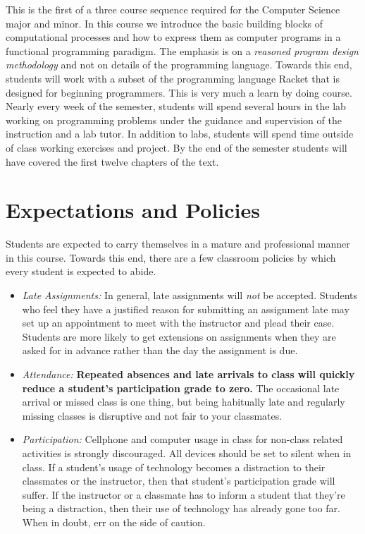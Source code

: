 \documentclass[10pt]{article}
\begin{document}
This is the first of a three course sequence required for the Computer Science major and minor. In this course we introduce the basic building blocks of computational processes and how to express them as computer programs in a functional programming paradigm. The emphasis is on a \textit{reasoned program design methodology} and not on details of the programming language. Towards this end, students will work with a subset of the programming language Racket that is designed for beginning programmers. This is very much a learn by doing course. Nearly every week of the semester, students will spend several hours in the lab working on programming problems under the guidance and supervision of the instruction and a lab tutor. In addition to labs, students will spend time outside of class working exercises and project. By the end of the semester students will have covered the first twelve chapters of the text.

\section{Expectations and Policies}

Students are expected to carry themselves in a mature and professional manner in this course. Towards this end, there are a few classroom policies by which every student is expected to abide.
\begin{itemize}

\item \textit{Late Assignments: } In general, late assignments will \textit{not} be accepted.  Students who feel they have a justified reason for submitting an assignment late may set up an appointment to meet with the instructor and plead their case.  Students are more likely to get extensions on assignments when they are asked for in advance rather than the day the assignment is due.

\item \textit{Attendance: } \textbf{Repeated absences and late arrivals to class will quickly reduce a student's participation grade to zero.}  The occasional late arrival or missed class is one thing, but being habitually late and regularly missing classes is disruptive and not fair to your classmates.

\item \textit{Participation: }  Cellphone and computer usage in class for non-class related activities is strongly discouraged.  All devices should be set to silent when in class.  If a student's usage of technology becomes a distraction to their classmates or the instructor, then that student's participation grade will suffer.  If the instructor or a classmate has to inform a student that they're being a distraction, then their use of technology has already gone too far.  When in doubt, err on the side of caution.

\end{itemize}
\end{document}
